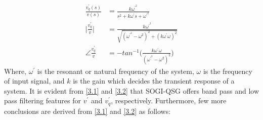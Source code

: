 \begin{equation} \label{3.2}
		\begin{aligned}
			\frac{v^{\prime}_{q}(s)}{v(s)} &= \frac{k\omega^{\prime^{2}}}{s^{2} + k\omega^{\prime} s + \omega^{\prime^{2}}} \\
			\Big|\frac{v^{\prime}_{q}}{v}\Big| &= \frac{ k\omega^{\prime^{2} } }{\sqrt{(\omega^{\prime^{2}}-\omega^{2})^{2} + (k\omega^{\prime}\omega)^{2}}} \\
			\angle{ \frac{ v^{\prime}_{q} } {v} } &= - tan^{-1}\Big(\frac{k\omega^{\prime}\omega}{(\omega^{\prime^{2}}-\omega^{2})^{2}}\Big)
		\end{aligned}
\end{equation} 
Where, $\omega^{\prime}$ is the resonant or natural frequency of the system, $\omega$ is the frequency of input signal, and $k$ is the gain which decides the transient response of a system. It is evident from \eqref{3.1} and \eqref{3.2} that SOGI-QSG offers band pass and low pass filtering features for $v^{\prime}$ and $v^{\prime}_{q}$, respectively. Furthermore, few more conclusions are derived from \eqref{3.1} and \eqref{3.2} as follows:

